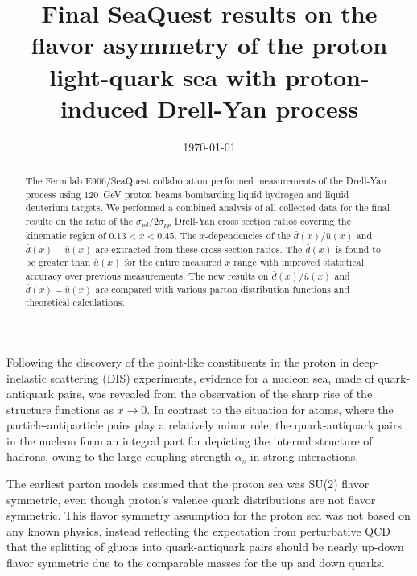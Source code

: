\documentclass[reprint,aps,unsortedaddress,superscriptaddress,prl,floatfix,showpacs,linenumbers]{revtex4-2}
\begin{document}
\title{Final SeaQuest results on the flavor asymmetry of the proton light-quark sea with proton-induced Drell-Yan process}


\date{\today}

\begin{abstract}
	The Fermilab E906/SeaQuest collaboration performed measurements of the Drell-Yan process using
	\SI{120}{\GeV} proton beams bombarding liquid hydrogen and liquid deuterium targets.
	We performed a combined analysis of all collected data for the final results on the ratio of the $\sigma_{pd}/2\sigma_{pp}$ Drell-Yan cross
	section ratios covering the kinematic region of $0.13 < x < 0.45$.
	The $x$-dependencies of the $\bar{d}\left(x\right) / \bar{u}\left(x\right)$ and $\bar{d}\left(x\right) - \bar{u}\left(x\right)$
	are extracted from these cross section ratios.
	The $\bar{d}\left(x\right)$ is found to be greater than $\bar{u}\left(x\right)$ for the entire measured $x$
	range with improved statistical accuracy over previous measurements.
	The new results on $\bar{d}\left(x\right) / \bar{u}\left(x\right)$ and $\bar{d}\left(x\right) - \bar{u}\left(x\right)$
	are compared with various parton distribution functions and theoretical calculations.
\end{abstract}


\maketitle


Following the discovery of the point-like constituents in the proton in
deep-inelastic scattering (DIS) experiments, evidence for a nucleon sea,
made of quark-antiquark pairs,
was revealed from the observation of the sharp rise of the structure
functions as $x \to 0$. In contrast to the situation for atoms, where
the particle-antiparticle pairs play a relatively minor role, the
quark-antiquark pairs in the nucleon form an integral part for
depicting the internal structure of hadrons, owing to the large
coupling strength $\alpha_s$ in strong interactions.

The earliest parton models assumed that the proton sea was SU(2)
flavor symmetric, even though proton's valence quark
distributions are not flavor symmetric. This flavor symmetry assumption
for the proton sea was not based on any known physics, instead reflecting the
expectation from perturbative QCD that the splitting of gluons
into quark-antiquark pairs should be nearly up-down flavor symmetric
due to the comparable masses for the up and down quarks.
\end{document}
